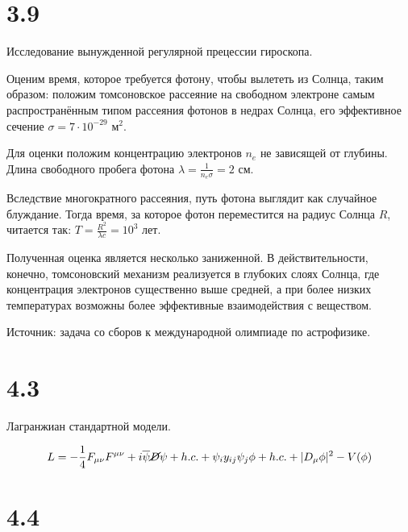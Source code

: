\documentclass[a4paper,14pt]{article}
\begin{document}
\section*{3.9}

\begin{center}
	Исследование вынужденной регулярной прецессии гироскопа.\\
\end{center}

Оценим время, которое требуется фотону, чтобы вылететь из Солнца, таким образом: положим томсоновское рассеяние на свободном электроне самым распространённым типом рассеяния фотонов в недрах Солнца, его эффективное сечение $\sigma = 7 \cdot 10^{-29} \text{ м}^2$.

Для оценки положим концентрацию электронов $n_e$ не зависящей от глубины. Длина свободного пробега фотона $\lambda = \frac{1}{n_e \sigma} = 2 \text{ см}$.

Вследствие многократного рассеяния, путь фотона выглядит как случайное блуждание. Тогда время, за которое фотон переместится на радиус Солнца $R$, читается так:
$T = \frac{R^2}{\lambda c} = 10^3 \text{ лет}.$

Полученная оценка является несколько заниженной. В действительности, конечно, томсоновский механизм реализуется в глубоких слоях Солнца, где концентрация электронов существенно выше средней, а при более низких температурах возможны более эффективные взаимодействия с веществом.

Источник: задача со сборов к международной олимпиаде по астрофизике.

\section*{4.3}

\begin{center}
	Лагранжиан стандартной модели.\\
\end{center}

\begin{equation*}
L = -\frac{1}{4} F_{\mu \nu} F^{\mu \nu} + i \overline{\psi} \cancel D \psi + h.c. + \psi_{i} y_{ij} \psi_{j} \phi + h.c. + |D_{\mu} \phi |^2 - V(\phi )
\end{equation*}

\section*{4.4}
\end{document}
